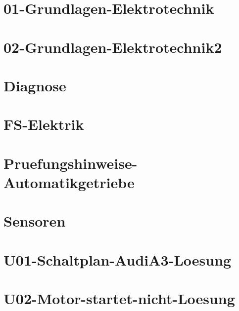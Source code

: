 



\chapter{01-Grundlagen-Elektrotechnik}
%
\chapter{02-Grundlagen-Elektrotechnik2}
%
\chapter{Diagnose}
%
\chapter{FS-Elektrik}
%
\chapter{Pruefungshinweise-Automatikgetriebe}
%
\chapter{Sensoren}
%
\chapter{U01-Schaltplan-AudiA3-Loesung}
%
\chapter{U02-Motor-startet-nicht-Loesung}
%



